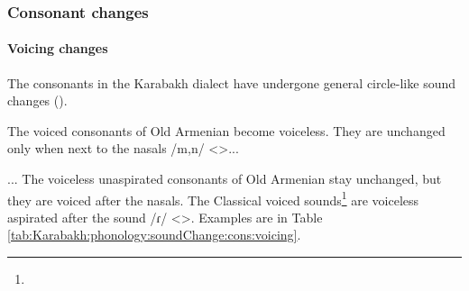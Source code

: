 \subsubsection{Consonant changes}

\paragraph{Voicing changes}

The consonants in the Karabakh dialect have undergone general circle-like sound changes (). 

The voiced consonants of Old Armenian become voiceless. They are unchanged only when next to the nasals /m,n/ <>... 

\begin{adjarianpage}\label{page:65}\end{adjarianpage}%


... The voiceless unaspirated consonants of Old Armenian stay unchanged, but they are voiced after the nasals. The Classical voiced sounds\footnote{} are voiceless aspirated after the sound /ɾ/ <>. Examples are in Table \ref{tab:Karabakh:phonology:soundChange:cons:voicing}. 


